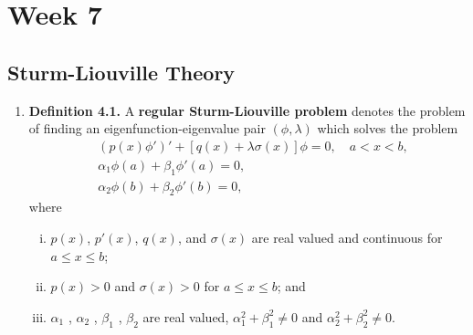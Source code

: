 \chapter{Week 7}
\setcounter{weekpage}{1}
\thispagestyle{plainweek}

\section{Sturm-Liouville Theory}


\begin{enumerate}


% 
% 
% 



\item \textbf{Definition 4.1.} A \textbf{regular Sturm-Liouville problem} denotes the problem of finding an eigenfunction-eigenvalue pair $(\phi, \lambda)$ which solves the problem
\begin{align*}
& (p(x)\phi ' ) ' + [q(x) + \lambda \sigma(x)]\phi = 0, \quad a < x < b,\\
& \alpha _1 \phi(a) + \beta _1 \phi ' (a) = 0, \\
& \alpha _2 \phi(b) + \beta _2 \phi ' (b) = 0,
\end{align*}
where
\begin{enumerate}[(i)]

\item $p(x)$, $p ' (x)$, $q(x)$, and $\sigma(x)$ are real valued and continuous for $a \leq x \leq b$;

\item $p(x) > 0$ and $\sigma(x) > 0$ for $a \leq x \leq b$; and

\item $\alpha_1$ , $\alpha _2$ , $\beta _1$ , $\beta _2$ are real valued, $\alpha _1 ^2 + \beta _1 ^2 \neq 0$ and $\alpha _2 ^2 + \beta _2 ^2 \neq 0$.
\end{enumerate}




\end{enumerate}
